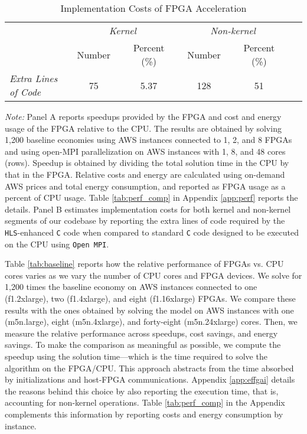 \documentclass[12pt,american]{article}
\makeatletter
\newcommand{\cpuI}{m5n.large\@\xspace}
\newcommand{\cpuII}{m5n.4xlarge\@\xspace}
\newcommand{\cpuIII}{m5n.24xlarge\@\xspace}
\newcommand{\awsinstfI}{f1.2xlarge\@\xspace}
\newcommand{\awsinstfII}{f1.4xlarge\@\xspace}
\newcommand{\awsinstfIII}{f1.16xlarge\@\xspace}
\newcommand{\extraLinesKernel}{75}
\newcommand{\extraLinesKernelpercent}{5.37}
\newcommand{\extraLinesNonkernel}{128}
\newcommand{\extraLinesNonkernelpercent}{51}
\newcommand{\numbeconII}{1,200\@\xspace}
\makeatother
\begin{document}
\begin{table}[ht!]
\begin{center}
\begin{subtable}{\textwidth}
\caption{Implementation Costs of FPGA Acceleration}
\label{tab:baseline:B} %
\begin{tabularx}{\textwidth}{p{4.5cm}XXXXXXXXXX}
\toprule
&&\multicolumn{3}{c}{\textit{Kernel}}&&\multicolumn{3}{c}{\textit{Non-kernel}}& \\
&&\multicolumn{1}{c}{Number}&&\multicolumn{1}{c}{Percent (\%)}&&\multicolumn{1}{c}{Number}&&\multicolumn{1}{c}{Percent (\%)} \\
\cmidrule{3-5}\cmidrule{7-9}
\textit{Extra Lines of Code} &&\multicolumn{1}{c}{\extraLinesKernel}&&\multicolumn{1}{c}{\extraLinesKernelpercent}&&\multicolumn{1}{c}{\extraLinesNonkernel}&&\multicolumn{1}{c}{\extraLinesNonkernelpercent} \\
\bottomrule
\end{tabularx}
\end{subtable}
\end{center}
\small \textit{Note:} Panel A reports speedups provided by the FPGA and cost and energy usage of the FPGA relative to the CPU. The results are obtained by solving \numbeconII baseline economies using AWS instances connected to 1, 2, and 8 FPGAs and using open-MPI parallelization on AWS instances with 1, 8, and 48 cores (rows). Speedup is obtained by dividing the total solution time in the CPU by that in the FPGA. Relative costs and energy are calculated using on-demand AWS prices and total energy consumption, and reported as FPGA usage as a percent of CPU usage. Table \ref{tab:perf_comp} in Appendix \ref{app:perf} reports the details. Panel B estimates implementation costs for both kernel and non-kernel segments of our codebase by reporting the extra lines of code required by the \texttt{HLS}-enhanced \texttt{C} code when compared to standard \texttt{C} code designed to be executed on the CPU using \texttt{Open MPI}.
\end{table}

Table \ref{tab:baseline} reports how the relative performance of FPGAs vs. CPU cores varies as we vary the number of CPU cores and FPGA devices. We solve for \numbeconII times the baseline economy on AWS instances connected to one (\awsinstfI), two (\awsinstfII), and eight (\awsinstfIII) FPGAs. We compare these results with the ones obtained by solving the model on AWS instances with one (\cpuI), eight (\cpuII), and forty-eight (\cpuIII) cores. Then, we measure the relative performance across speedups, cost savings, and energy savings. To make the comparison as meaningful as possible, we compute the speedup using the solution time---which is the time required to solve the algorithm on the FPGA/CPU. This approach abstracts from the time absorbed by initializations and host-FPGA communications. Appendix \ref{app:effgai} details the reasons behind this choice by also reporting the execution time, that is, accounting for non-kernel operations. Table \ref{tab:perf_comp} in the Appendix complements this information by reporting costs and energy consumption by instance.
\end{document}
